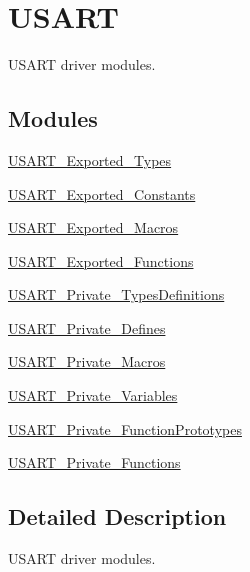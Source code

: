 \hypertarget{group___u_s_a_r_t}{}\section{U\+S\+A\+RT}
\label{group___u_s_a_r_t}


U\+S\+A\+RT driver modules.  


\subsection*{Modules}
\begin{DoxyCompactItemize}
\item 
\mbox{\hyperlink{group___u_s_a_r_t___exported___types}{U\+S\+A\+R\+T\+\_\+\+Exported\+\_\+\+Types}}
\item 
\mbox{\hyperlink{group___u_s_a_r_t___exported___constants}{U\+S\+A\+R\+T\+\_\+\+Exported\+\_\+\+Constants}}
\item 
\mbox{\hyperlink{group___u_s_a_r_t___exported___macros}{U\+S\+A\+R\+T\+\_\+\+Exported\+\_\+\+Macros}}
\item 
\mbox{\hyperlink{group___u_s_a_r_t___exported___functions}{U\+S\+A\+R\+T\+\_\+\+Exported\+\_\+\+Functions}}
\item 
\mbox{\hyperlink{group___u_s_a_r_t___private___types_definitions}{U\+S\+A\+R\+T\+\_\+\+Private\+\_\+\+Types\+Definitions}}
\item 
\mbox{\hyperlink{group___u_s_a_r_t___private___defines}{U\+S\+A\+R\+T\+\_\+\+Private\+\_\+\+Defines}}
\item 
\mbox{\hyperlink{group___u_s_a_r_t___private___macros}{U\+S\+A\+R\+T\+\_\+\+Private\+\_\+\+Macros}}
\item 
\mbox{\hyperlink{group___u_s_a_r_t___private___variables}{U\+S\+A\+R\+T\+\_\+\+Private\+\_\+\+Variables}}
\item 
\mbox{\hyperlink{group___u_s_a_r_t___private___function_prototypes}{U\+S\+A\+R\+T\+\_\+\+Private\+\_\+\+Function\+Prototypes}}
\item 
\mbox{\hyperlink{group___u_s_a_r_t___private___functions}{U\+S\+A\+R\+T\+\_\+\+Private\+\_\+\+Functions}}
\end{DoxyCompactItemize}


\subsection{Detailed Description}
U\+S\+A\+RT driver modules. 


